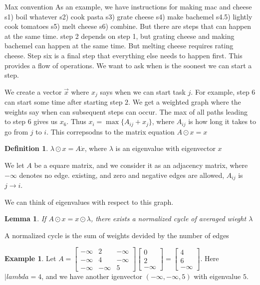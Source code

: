 \documentclass[12pt]{memoir}
\newtheorem{protolemma}[prototheorem]{Lemma}
\newenvironment{lemma}
   {\begin{protolemma}}
   {\end{protolemma}}
\theoremstyle{definition}
\newtheorem{protoexample}{Example}[section]
\newenvironment{ex}
   {\begin{protoexample}}
   {\end{protoexample}}
\newtheorem{protodefinition}{Definition}[section]
\newenvironment{define}
   {\begin{protodefinition}}
   {\end{protodefinition}}
\begin{document}




Max convention
As an example, we have instructions for making mac and cheese
s1)  boil whatever
s2) cook pasta
s3) grate cheese
s4) make bachemel
s4.5) lightly cook tomatoes
s5) melt cheese
s6) combine. But there are steps that can happen at the same time. step 2 depends on step 1, but grating cheese and making bachemel can happen at the same time. But melting cheese requires rating cheese. Step six is a final step that everything else needs to happen first. This provides a flow of operations. We want to ask when is the soonest we can start a step.

We create a vector $\overrightarrow{x}$ where $x_j$ says when we can start task $j$. For example, step 6 can start some time after starting step $2$. We get a weighted graph where the weights say when can subsequent steps can occur. The max of all paths leading to step $6$ gives us $x_6$. Thus $x_i = \max\{A_{ij} +x_j\}$, where $A_{ij}$ is how long it takes to go from $j$ to $i$. This correpsodns to the matrix equation $A \odot x = x$



\begin{define}
$\lambda \odot x = A \dot x$, where $\lambda$ is an eigenvalue with eigenvector $x$
\end{define}


We let $A$ be a equare matrix, and we consider it as an adjacency matrix, where $-\infty$ denotes no edge. existing, and zero and negative edges are allowed, $A_{ij}$ is $j \rightarrow i$.


We can think of eigenvalues with respect to this graph.

\begin{lemma}
    If $A\odot x = x \odot \lambda$, there exists a normalized cycle of averaged wieght $\lambda$
\end{lemma}

A normalized cycle is the sum of weights devided by the number of edges
\begin{ex}
Let $A = \begin{bmatrix}
    -\infty & 2 & - \infty\\ -\infty &4 & - \infty \\ -\infty & - \infty &5
\end{bmatrix} \begin{bmatrix}
    0\\2\\-\infty
\end{bmatrix}= \begin{bmatrix}
    4 \\ 6 \\-\infty
\end{bmatrix}.$ Here $|lambda = 4$, and we have another igenvector $(-\infty, -\infty, 5)$ with eigenvalue $5$.
\end{ex}
\end{document}
